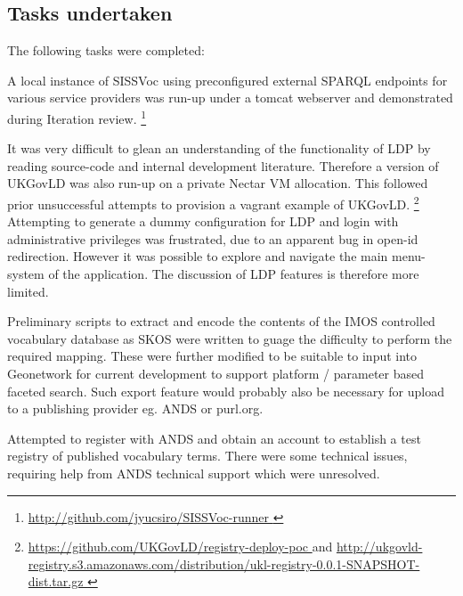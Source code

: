 \documentclass[10pt,a4paper]{article}
\begin{document}
\begin{flushleft}
\clearpage



\section{
  Tasks undertaken
}

%  
  The following tasks were completed:  

    \item[] A local instance of SISSVoc using preconfigured external SPARQL
  endpoints for various service providers was run-up under a tomcat webserver and
  demonstrated during Iteration review.  \footnote{ \url {
  http://github.com/jyucsiro/SISSVoc-runner }  } 

    \item[] It was very difficult to glean an understanding of the
  functionality of LDP by reading source-code and internal development
  literature. Therefore a version of UKGovLD was also run-up on a private Nectar
  VM allocation. This followed prior unsuccessful attempts to provision a vagrant
  example of UKGovLD.  \footnote{ \url {
  https://github.com/UKGovLD/registry-deploy-poc } and \url {
  http://ukgovld-registry.s3.amazonaws.com/distribution/ukl-registry-0.0.1-SNAPSHOT-dist.tar.gz
  } }
    Attempting to generate a dummy configuration for LDP and login with
  administrative privileges was frustrated, due to an apparent bug in open-id redirection.
  However it was possible to explore and navigate the main menu-system of the
  application.
    The discussion of LDP features is therefore more limited.

    \item[] Preliminary scripts to extract and encode the contents of the IMOS
  controlled vocabulary database as SKOS were written to guage the difficulty to
  perform the required mapping. These were further modified to be suitable to
  input into Geonetwork for current development to support platform / parameter
  based faceted search. Such export feature would probably also be necessary for
  upload to a publishing provider eg. ANDS or purl.org. 

    \item[] Attempted to register with ANDS and obtain an account to establish a
  test registry of published vocabulary terms. There were some technical issues,
  requiring help from ANDS technical support which were unresolved.
      

\end{flushleft}
\end{document}
